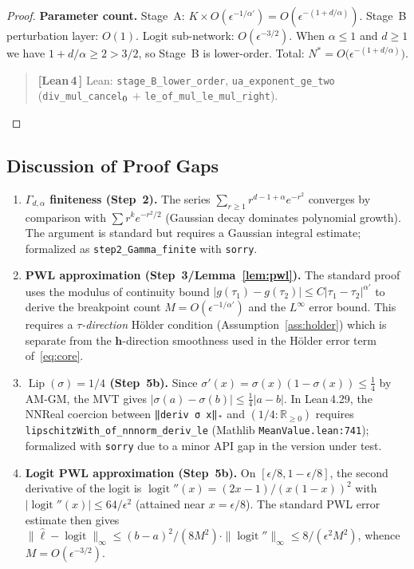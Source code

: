 \documentclass[11pt]{article}
\theoremstyle{remark}
\newcommand{\verified}{%
  \textcolor{green!60!black}{\textbf{[Lean\,4\,\checkmark]}}}
\newcommand{\R}{\mathbb{R}}
\newcommand{\hhat}{\boldsymbol{h}}
\newcommand{\sigmoid}{\sigma}
\begin{document}
\begin{proof}
\textbf{Parameter count.}
Stage~A: $K \times O(\epsilon^{-1/\alpha'}) = O(\epsilon^{-(1+d/\alpha)})$.
Stage~B perturbation layer: $O(1)$.
Logit sub-network: $O(\epsilon^{-3/2})$.
When $\alpha \le 1$ and $d \ge 1$ we have $1 + d/\alpha \ge 2 > 3/2$,
so Stage~B is lower-order.
Total: $N^* = O\!\bigl(\epsilon^{-(1+d/\alpha)}\bigr)$.
\begin{quote}\small\verified{} Lean: \texttt{stage\_B\_lower\_order},
\texttt{ua\_exponent\_ge\_two}
(\texttt{div\_mul\_cancel\(\sb0\)} $+$ \texttt{le\_of\_mul\_le\_mul\_right}).\end{quote}
\end{proof}

\subsection{Discussion of Proof Gaps}

\begin{enumerate}
  \item \textbf{$\Gamma_{d,\alpha}$ finiteness (Step~2).}
    The series $\sum_{r\ge 1} r^{d-1+\alpha} e^{-r^2}$ converges
    by comparison with $\sum r^k e^{-r^2/2}$ (Gaussian decay dominates
    polynomial growth).  The argument is standard but requires a
    Gaussian integral estimate; formalized as \texttt{step2\_Gamma\_finite} with
    \texttt{sorry}.

  \item \textbf{PWL approximation (Step~3/Lemma~\ref{lem:pwl}).}
    The standard proof uses the modulus of continuity bound
    $|g(\tau_1) - g(\tau_2)| \le C|\tau_1-\tau_2|^{\alpha'}$
    to derive the breakpoint count $M = O(\epsilon^{-1/\alpha'})$
    and the $L^\infty$ error bound.
    This requires a \emph{$\tau$-direction} Hölder condition
    (Assumption~\ref{ass:holder}) which is separate from the
    $\hhat$-direction smoothness used in the H\"{o}lder error term of~\eqref{eq:core}.

  \item \textbf{$\operatorname{Lip}(\sigmoid) = 1/4$ (Step~5b).}
    Since $\sigmoid'(x) = \sigmoid(x)(1-\sigmoid(x)) \le \frac{1}{4}$
    by AM-GM, the MVT gives
    $|\sigmoid(a) - \sigmoid(b)| \le \frac{1}{4}|a-b|$.
    In Lean\,4.29, the NNReal coercion between
    \texttt{‖deriv σ x‖₊} and $(1/4:\R_{\ge 0})$ requires
    \texttt{lipschitzWith\_of\_nnnorm\_deriv\_le}
    (Mathlib \texttt{MeanValue.lean:741}); formalized with \texttt{sorry}
    due to a minor API gap in the version under test.

  \item \textbf{Logit PWL approximation (Step~5b).}
    On $[\epsilon/8, 1-\epsilon/8]$, the second derivative of the logit
    is $\operatorname{logit}''(x) = (2x-1)/(x(1-x))^2$
    with $|\operatorname{logit}''(x)| \le 64/\epsilon^2$
    (attained near $x = \epsilon/8$).  The standard PWL error estimate
    then gives $\|\hat{\ell} - \operatorname{logit}\|_\infty \le (b-a)^2/(8M^2)
    \cdot \|\operatorname{logit}''\|_\infty \le 8/(\epsilon^2 M^2)$,
    whence $M = O(\epsilon^{-3/2})$.
\end{enumerate}
\end{document}
